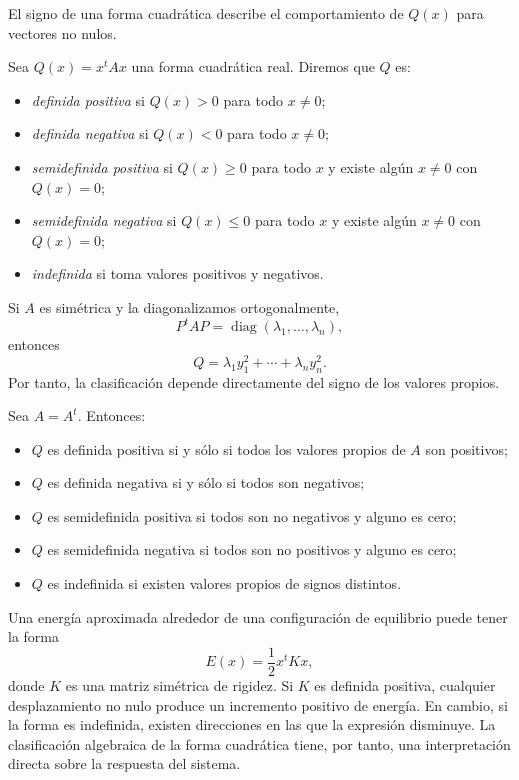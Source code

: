 El signo de una forma cuadrática describe el comportamiento de $Q(x)$ para vectores no nulos.

\begin{definition}
Sea $Q(x)=x^tAx$ una forma cuadrática real. Diremos que $Q$ es:
\begin{itemize}
\item \emph{definida positiva} si $Q(x)>0$ para todo $x\neq0$;
\item \emph{definida negativa} si $Q(x)<0$ para todo $x\neq0$;
\item \emph{semidefinida positiva} si $Q(x)\geq0$ para todo $x$ y existe algún $x\neq0$ con $Q(x)=0$;
\item \emph{semidefinida negativa} si $Q(x)\leq0$ para todo $x$ y existe algún $x\neq0$ con $Q(x)=0$;
\item \emph{indefinida} si toma valores positivos y negativos.
\end{itemize}
\end{definition}

Si $A$ es simétrica y la diagonalizamos ortogonalmente,
\[
P^tAP=\operatorname{diag}(\lambda_1,\ldots,\lambda_n),
\]
entonces
\[
Q=\lambda_1y_1^2+\cdots+\lambda_ny_n^2.
\]
Por tanto, la clasificación depende directamente del signo de los valores propios.

\begin{theorem}
Sea $A=A^t$. Entonces:
\begin{itemize}
\item $Q$ es definida positiva si y sólo si todos los valores propios de $A$ son positivos;
\item $Q$ es definida negativa si y sólo si todos son negativos;
\item $Q$ es semidefinida positiva si todos son no negativos y alguno es cero;
\item $Q$ es semidefinida negativa si todos son no positivos y alguno es cero;
\item $Q$ es indefinida si existen valores propios de signos distintos.
\end{itemize}
\end{theorem}

\begin{example}
Una energía aproximada alrededor de una configuración de equilibrio puede tener la forma
\[
E(x)=\frac12x^tKx,
\]
donde $K$ es una matriz simétrica de rigidez. Si $K$ es definida positiva, cualquier desplazamiento no nulo produce un incremento positivo de energía. En cambio, si la forma es indefinida, existen direcciones en las que la expresión disminuye. La clasificación algebraica de la forma cuadrática tiene, por tanto, una interpretación directa sobre la respuesta del sistema.
\end{example}

